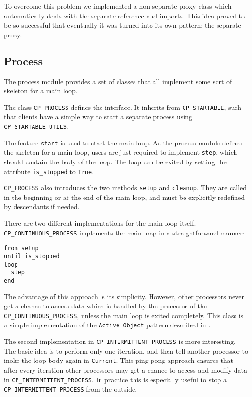 \documentclass[a4paper,10pt]{report}
\begin{document}
To overcome this problem we implemented a non-separate proxy class which automatically deals with the separate reference and imports.
This idea proved to be so successful that eventually it was turned into its own pattern: the separate proxy.



\subsection{Process}

The process module provides a set of classes that all implement some sort of skeleton for a main loop.

The class \lstinline!CP_PROCESS! defines the interface.
It inherits from \lstinline!CP_STARTABLE!, such that clients have a simple way to start a separate process using \lstinline!CP_STARTABLE_UTILS!.

The feature \lstinline!start! is used to start the main loop.
As the process module defines the skeleton for a main loop, users are just required to implement \lstinline!step!, which should contain the body of the loop.
The loop can be exited by setting the attribute \lstinline!is_stopped! to \lstinline!True!.

\lstinline!CP_PROCESS! also introduces the two methods \lstinline!setup! and \lstinline!cleanup!.
They are called in the beginning or at the end of the main loop, and must be explicitly redefined by descendants if needed.

There are two different implementations for the main loop itself.
\lstinline!CP_CONTINUOUS_PROCESS! implements the main loop in a straightforward manner:
\begin{lstlisting}
from setup
until is_stopped
loop
  step
end
\end{lstlisting}
The advantage of this approach is its simplicity.
However, other processors never get a chance to access data which is handled by the processor of the \lstinline!CP_CONTINUOUS_PROCESS!, unless the main loop is exited completely.
This class is a simple implementation of the \lstinline!Active Object! pattern described in .

The second implementation in \lstinline!CP_INTERMITTENT_PROCESS! is more interesting.
The basic idea is to perform only one iteration, and then tell another processor to inoke the loop body again in \lstinline!Current!.
This ping-pong approach ensures that after every iteration other processors may get a chance to access and modify data in \lstinline!CP_INTERMITTENT_PROCESS!.
In practice this is especially useful to stop a \lstinline!CP_INTERMITTENT_PROCESS! from the outside.
\end{document}
